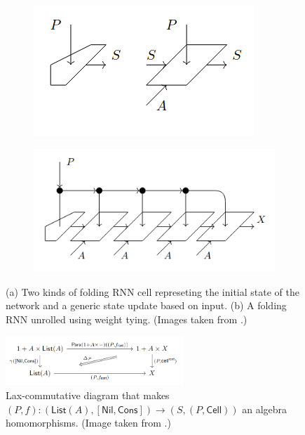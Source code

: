 \documentclass[11pt,a4paper,openright,twoside]{report}
\theoremstyle{plain}
\theoremstyle{definition}
\begin{document}
\begin{figure}[h]
  \begin{center}
    \begin{subfigure}{0.3\textwidth}
      \includegraphics[width=\textwidth]{figures/folding_rnn_cell.png}
      \caption{}
    \end{subfigure}
    \begin{subfigure}{0.48\textwidth}
      \includegraphics[width=\textwidth]{figures/folding_rnn.png}
      \caption{}
    \end{subfigure}            
    \caption[Folding RNN]{(a) Two kinds of folding RNN cell represeting the initial state of the network and a generic state update based on input. (b) A folding RNN unrolled using weight tying. (Images taken from \cite{gavranovicposition}.)}
    \label{fig: foldingrnn}
  \end{center}
\end{figure}

\begin{figure}[h]
  \begin{center}
    \includegraphics[width=0.6\textwidth]{figures/folding_rnn_lax_diagram.png}     
    \caption[Lax-commutative diagram for the unrolling of a folding RNN]{ Lax-commutative diagram that makes $(P,f): (\mathsf{List}(A), [\mathsf{Nil}, \mathsf{Cons}]) \to (S,(P,\mathsf{Cell}))$ an algebra homomorphisms. (Image taken from \cite{gavranovicposition}.)}
    \label{fig: foldingrnncommdiag}
  \end{center}
\end{figure}
\end{document}
